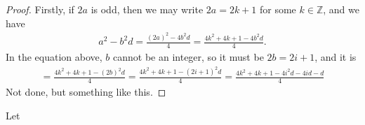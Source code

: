 \begin{proof}
    Firstly, if \(2a\) is odd, then we may write \(2a = 2k + 1\) for some \(k \in \mathbb{Z}\), and we have
    \begin{align*}
        a^2 - b^2 d = \frac{(2a)^2 - 4 b^2d}{4} = \frac{4k^2 + 4k + 1 - 4b^2 d}{4} \text{.}
    \end{align*}
    In the equation above, \(b\) cannot be an integer, so it must be \(2b = 2i + 1\), and it is
    \begin{align*}
        = \frac{4k^2 + 4k + 1 - (2b)^2 d}{4} = \frac{4k^2 + 4k + 1 - (2i + 1)^2 d}{4} = \frac{4k^2 + 4k + 1 - 4i^2d - 4id - d}{4}
    \end{align*}
    Not done, but something like this.
\end{proof}

\begin{exmbox}
    \begin{example}
        Let \(\)
    \end{example}
\end{exmbox}